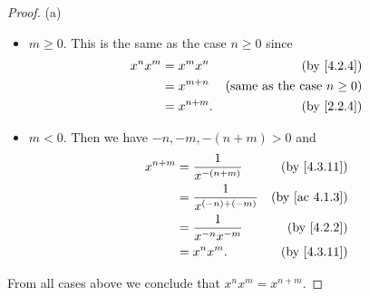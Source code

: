 \begin{proof}{(a)}
\begin{itemize}
\begin{itemize}
                  \begin{itemize}
                    \item \(m \geq 0\).
                          This is the same as the case \(n \geq 0\) since
                          \begin{align*}
                            x^n x^m & = x^m x^n    & \text{(by \cref{4.2.4})}               \\
                                    & = x^{m + n}  & \text{(same as the case \(n \geq 0\))} \\
                                    & = x^{n + m}. & \text{(by \cref{2.2.4})}
                          \end{align*}
                    \item \(m < 0\).
                          Then we have \(-n, -m, -(n + m) > 0\) and
                          \begin{align*}
                            x^{n + m} & = \frac{1}{x^{-(n + m)}}    & \text{(by \cref{4.3.11})}   \\
                                      & = \frac{1}{x^{(-n) + (-m)}} & \text{(by \cref{ac 4.1.3})} \\
                                      & = \frac{1}{x^{-n} x^{-m}}   & \text{(by \cref{4.2.2})}    \\
                                      & = x^n x^m.                  & \text{(by \cref{4.3.11})}
                          \end{align*}
                  \end{itemize}
          \end{itemize}
  \end{itemize}
  From all cases above we conclude that \(x^n x^m = x^{n + m}\).


\end{proof}
